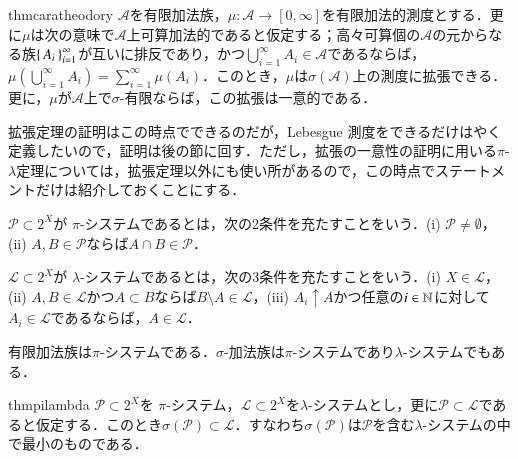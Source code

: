 \begin{restatable}{thm}{caratheodory}\label{拡張定理}
$\mathcal{A}$を有限加法族，$\mu \colon \mathcal{A} \to [0,\infty]$を有限加法的測度とする．更に$\mu$は次の意味で$\mathcal{A}$上可算加法的であると仮定する；高々可算個の$\mathcal{A}$の元からなる族$\set{A_i}_{i=1}^\infty$が互いに排反であり，かつ$\bigcup_{i=1}^\infty A_i \in \mathcal{A}$であるならば，$\mu\left(\bigcup_{i=1}^\infty A_i \right) = \sum_{i=1}^\infty \mu(A_i)$．このとき，$\mu$は$\sigma(\mathcal{A})$上の測度に拡張できる．更に，$\mu$が$\mathcal{A}$上で$\sigma$-有限ならば，この拡張は一意的である．
\end{restatable}

拡張定理の証明はこの時点でできるのだが，Lebesgue 測度をできるだけはやく定義したいので，証明は後の節に回す．ただし，拡張の一意性の証明に用いる$\pi$-$\lambda$定理については，拡張定理以外にも使い所があるので，この時点でステートメントだけは紹介しておくことにする．

\begin{defi}
$\mathcal{P} \subset 2^X$が $\pi$-システムであるとは，次の2条件を充たすことをいう．(i) $\mathcal{P} \neq \emptyset$，(ii) $A, B \in \mathcal{P}$ならば$A \cap B \in \mathcal{P}$．

$\mathcal{L} \subset 2^X$が $\lambda$-システムであるとは，次の3条件を充たすことをいう．(i) $X \in \mathcal{L}$，(ii) $A, B \in \mathcal{L}$かつ$A \subset B$ならば$B \setminus A \in \mathcal{L}$，(iii) $A_i \uparrow A$かつ任意の$i \in \mathbb{N}$に対して$A_i \in \mathcal{L}$であるならば，$A \in \mathcal{L}$．
\end{defi}

\begin{que}
有限加法族は$\pi$-システムである．$\sigma$-加法族は$\pi$-システムであり$\lambda$-システムでもある．
\end{que}

\begin{restatable}{thm}{pilambda}\label{Dynkin族定理}
$\mathcal{P} \subset 2^X$を $\pi$-システム，$\mathcal{L} \subset 2^X$を$\lambda$-システムとし，更に$\mathcal{P} \subset \mathcal{L}$であると仮定する．このとき$\sigma(\mathcal{P})\subset \mathcal{L}$．すなわち$\sigma(\mathcal{P})$は$\mathcal{P}$を含む$\lambda$-システムの中で最小のものである．
\end{restatable}

